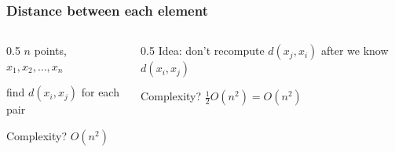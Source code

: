 \documentclass[aspectratio=169,hyperref={bookmarks=false,urlcolor=blue,colorlinks=true},10pt]{beamer}
\begin{document}
\begin{frame}
  \frametitle{Distance between each element}

  \begin{columns}
    \begin{column}{0.5\textwidth}
      $n$ points, $x_1,x_2,\ldots,x_n$

      find $d(x_i,x_j)$ for each pair

      \pause
      \vspace{\baselineskip}

      \begin{algorithm}[H]
      \end{algorithm}

      \vspace{\baselineskip}

      Complexity?
      \pause
      $O(n^2)$
    \end{column}
    \begin{column}{0.5\textwidth}
      \pause
      Idea: don't recompute $d(x_j,x_i)$ after we know $d(x_i,x_j)$

      \pause
      \vspace{\baselineskip}

      \begin{algorithm}[H]
      \end{algorithm}

      \vspace{\baselineskip}

      Complexity?
      \pause
      $\frac{1}{2}O(n^2) = O(n^2)$
    \end{column}
  \end{columns}
\end{frame}
\end{document}
